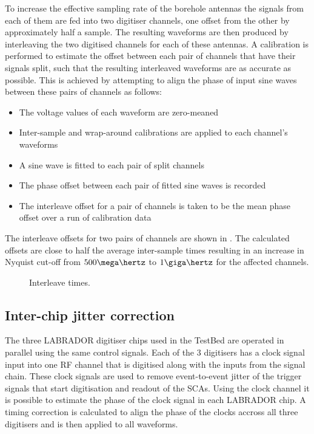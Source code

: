 To increase the effective sampling rate of the borehole antennas the signals from each of them are fed into two digitiser channels, one offset from the other by approximately half a sample. The resulting waveforms are then produced by interleaving the two digitised channels for each of these antennas. A calibration is performed to estimate the offset between each pair of channels that have their signals split, such that the resulting interleaved waveforms are as accurate as possible. This is achieved by attempting to align the phase of input sine waves between these pairs of channels as follows:

\begin{itemize}
\item The voltage values of each waveform are zero-meaned
\item Inter-sample and wrap-around calibrations are applied to each channel's waveforms
\item A sine wave is fitted to each pair of split channels
\item The phase offset between each pair of fitted sine waves is recorded
\item The interleave offset for a pair of channels is taken to be the mean phase offset over a run of calibration data
\end{itemize}

The interleave offsets for two pairs of channels are shown in . The calculated offsets are close to half the average inter-sample times resulting in an increase in Nyquist cut-off from $500 \mega\hertz$ to $1\giga\hertz$ for the affected channels.

\begin{figure}[htpb]
  \hfill
  \caption{Interleave times.}
  \label{fig:calibration:LABRADOR-Digitiser-Chip:Interleave}
\end{figure}


\subsection{Inter-chip jitter correction}
\label{sec:calibration:LABRADOR-Digitiser-Chip:Inter-chip-jitter-correction}

The three LABRADOR digitiser chips used in the TestBed are operated in parallel using the same control signals. Each of the 3 digitisers has a clock signal input into one RF channel that is digitised along with the inputs from the signal chain. These clock signals are used to remove event-to-event jitter of the trigger signals that start digitisation and readout of the SCAs. Using the clock channel it is possible to estimate the phase of the clock signal in each LABRADOR chip. A timing correction is calculated to align the phase of the clocks accross all three digitisers and is then applied to all waveforms.

